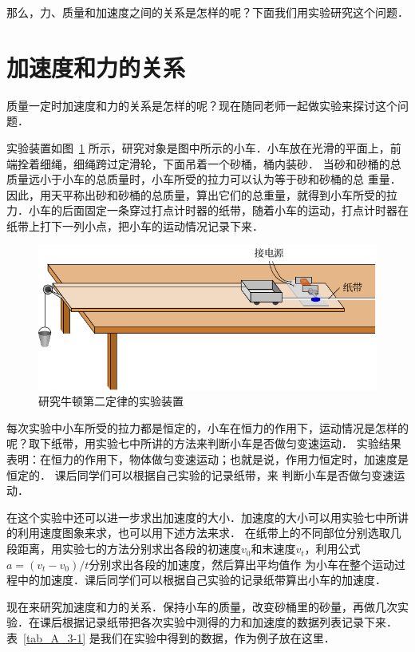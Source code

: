 那么，力、质量和加速度之间的关系是怎样的呢？下面我们用实验研究这个问题．


\section{加速度和力的关系}\label{sec-A-3-relationship-between-acceleration-and-force}
质量一定时加速度和力的关系是怎样的呢？现在随同老师一起做实验来探讨这个问题．

实验装置如图~\ref{fig_A_3-3} 所示，研究对象是图中所示的小车．小车放在光滑的平面上，前端拴着细绳，细绳跨过定滑轮，下面吊着一个砂桶，桶内装砂．
当砂和砂桶的总质量远小于小车的总质量时，小车所受的拉力可以认为等于砂和砂桶的总
重量．因此，用天平称出砂和砂桶的总质量，算出它们的总重量，就得到小车所受的拉力．小车的后面固定一条穿过打点计时器的纸带，随着小车的运动，打点计时器在纸带上打下一列小点，把小车的运动情况记录下来．

\begin{figure}[htp]
    \centering
    \includegraphics{fig/A/3-3.pdf}
    \caption{研究牛顿第二定律的实验装置}\label{fig_A_3-3}
\end{figure}

每次实验中小车所受的拉力都是恒定的，小车在恒力的作用下，运动情况是怎样的呢？取下纸带，用实验七中所讲的方法来判断小车是否做匀变速运动．
实验结果表明：在恒力的作用下，物体做匀变速运动；也就是说，作用力恒定时，加速度是恒定的．
课后同学们可以根据自己实验的记录纸带，来
判断小车是否做匀变速运动．

在这个实验中还可以进一步求出加速度的大小．加速度的大小可以用实验七中所讲的利用速度图象来求，也可以用下述方法来求．
在纸带上的不同部位分别选取几段距离，用实验七的方法分别求出各段的初速度$v_0$和末速度$v_t$，利用公式$a=(v_t-v_0)/t$分别求出各段的加速度，然后算出平均值作
为小车在整个运动过程中的加速度．课后同学们可以根据自己实验的记录纸带算出小车的加速度．

现在来研究加速度和力的关系．保持小车的质量，改变砂桶里的砂量，再做几次实验．在课后根据记录纸带把各次实验中测得的力和加速度的数据列表记录下来．
表~\ref{tab_A_3-1} 是我们在实验中得到的数据，作为例子放在这里．


